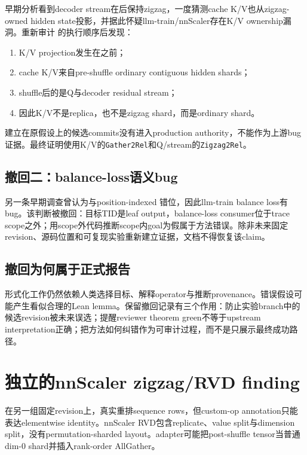 \documentclass[10.5pt,a4paper]{ctexart}
\begin{document}
早期分析看到decoder stream在后保持zigzag，一度猜测cache K/V也从zigzag-owned hidden state投影，并据此怀疑llm-train/nnScaler存在K/V ownership漏洞。重新审计
的执行顺序后发现：
\begin{enumerate}
  \item K/V projection发生在之前；
  \item cache K/V来自pre-shuffle ordinary contiguous hidden shards；
  \item shuffle后的是Q与decoder residual stream；
  \item 因此K/V不是replica，也不是zigzag shard，而是ordinary shard。
\end{enumerate}

建立在原假设上的候选commits没有进入production authority，不能作为上游bug证据。最终证明使用K/V的\texttt{Gather2Rel}和Q/stream的\texttt{Zigzag2Rel}。

\subsection{撤回二：balance-loss语义bug}

另一条早期调查曾认为与position-indexed 错位，因此llm-train balance loss有bug。该判断被撤回：目标TID是leaf output，balance-loss consumer位于trace scope之外；用scope外代码推断scope内goal为假属于方法错误。除非未来固定revision、源码位置和可复现实验重新建立证据，文档不得恢复该claim。

\subsection{撤回为何属于正式报告}

形式化工作仍然依赖人类选择目标、解释operator与推断provenance。错误假设可能产生看似合理的Lean lemma。保留撤回记录有三个作用：防止实验branch中的候选revision被未来误选；提醒reviewer theorem green不等于upstream interpretation正确；把方法如何纠错作为可审计过程，而不是只展示最终成功路径。

\section{独立的nnScaler zigzag/RVD finding}

在另一组固定revision上，真实重排sequence rows，但custom-op annotation只能表达elementwise identity。nnScaler RVD包含replicate、value split与dimension split，没有permutation-sharded layout。adapter可能把post-shuffle tensor当普通dim-0 shard并插入rank-order AllGather。
\end{document}
